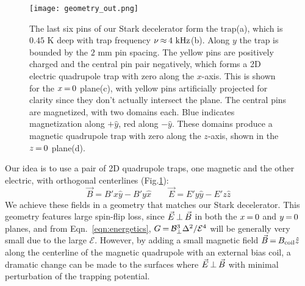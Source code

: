 \documentclass[%
 reprint,
 amsmath,amssymb,
 aps,
prl,
]{revtex4-1}
\newcommand{\epb}{{$\vec{E}\s {\perp}\s\vec{B}$}}
\newcommand{\s}{{\nobreak\hspace{.2em}}}
\begin{document}



\begin{figure}[tb]
\texttt{[image: geometry\_out.png]}%
\caption{
The last six pins of our Stark decelerator\s\cite{Sawyer2008} form the trap\s(a), which is $0.45\text{ K}$ deep with trap frequency $\nu\s {\approx}\s 4\text{ kHz}$\s(b).
Along $y$ the trap is bounded by the $2\text{ mm}$ pin spacing.
The yellow pins are positively charged and the central pin pair negatively, which forms a 2D electric quadrupole trap with zero along the $x$-axis.
This is shown for the $x\s {=}\s 0$ plane\s(c), with yellow pins artificially projected for clarity since they don't actually intersect the plane.
The central pins are magnetized, with two domains each.
Blue indicates magnetization along $+\hat{y}$, red along $-\hat{y}$.
These domains produce a magnetic quadrupole trap with zero along the $z$-axis, shown in the $z\s {=}\s 0$ plane\s(d).
\label{fig:CAD}}
\end{figure}

Our idea is to use a pair of 2D quadrupole traps, one magnetic and the other electric, with orthogonal centerlines (Fig.\s\ref{fig:CAD}):
\begin{equation}
\label{eqn:BE}
\vec{B}=B'x\hat{y}-B'y\hat{x}\quad\quad\vec{E}=E'y\hat{y}-E'z\hat{z}
\end{equation}
We achieve these fields in a geometry that matches our Stark decelerator\s\cite{Bochinski2003}.
This geometry features large spin-flip loss, since \epb{} in both the $x\s {=}\s 0$ and $y\s {=}\s 0$ planes, and from Eqn.~\ref{eqn:energetics}, $G\s {=} \s \mathcal{B}_\perp^3\Delta^2/\mathcal{E}^4$ will be generally very small due to the large $\mathcal{E}$.
However, by adding a small magnetic field $\vec{B}\s {=}\s B_\text{coil}\hat{z}$ along the centerline of the magnetic quadrupole with an external bias coil, a dramatic change can be made to the surfaces where \epb{} with minimal perturbation of the trapping potential.
\end{document}
